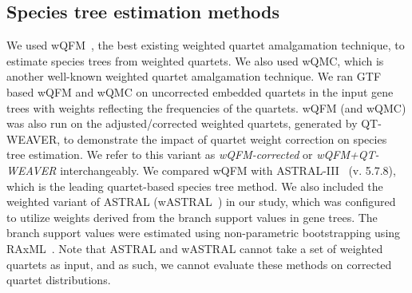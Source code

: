 \documentclass[10pt,a4paper]{article}
\newcommand{\addb}[1]{{\color{red} #1}}
\begin{document}
\subsection{Species tree estimation methods}
We used wQFM~\cite{wqfm}, the best existing weighted quartet amalgamation technique, to estimate species trees from weighted quartets. We also used wQMC, which is another well-known weighted quartet amalgamation technique. %
We ran GTF based wQFM and wQMC on uncorrected embedded quartets in the input gene trees with weights reflecting the frequencies of the quartets. %
wQFM (and wQMC) was also run on the adjusted/corrected weighted quartets, generated by QT-WEAVER, to demonstrate the impact of quartet weight correction on species tree estimation. We refer to this variant as \textit{wQFM-corrected} or \textit{wQFM+QT-WEAVER} interchangeably. We compared wQFM with ASTRAL-III~\cite{astral,zhang2018astral} (v. 5.7.8), which is the leading quartet-based species tree method. We also included the weighted variant of ASTRAL (wASTRAL~\cite{zhang2022weighting}) in our study, which was configured to utilize weights derived from the branch support values in gene trees. The branch support values were estimated using non-parametric bootstrapping using RAxML~\cite{raxml-bootstrap}. Note that ASTRAL and wASTRAL cannot take a set of weighted quartets as input, and as such, we cannot evaluate these methods on corrected quartet distributions.



 
\end{document}
